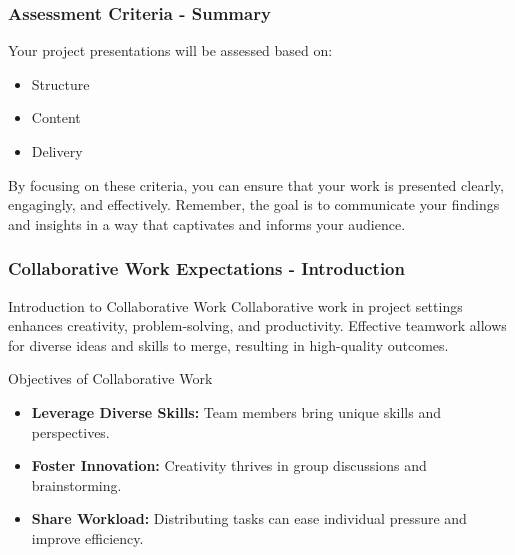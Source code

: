\documentclass[aspectratio=169]{beamer}
\begin{document}
\begin{frame}[fragile]
  \frametitle{Assessment Criteria - Summary}
  Your project presentations will be assessed based on:
  \begin{itemize}
    \item Structure
    \item Content
    \item Delivery
  \end{itemize}
  
  By focusing on these criteria, you can ensure that your work is presented clearly, engagingly, and effectively. 
  Remember, the goal is to communicate your findings and insights in a way that captivates and informs your audience.
\end{frame}

\begin{frame}[fragile]
    \frametitle{Collaborative Work Expectations - Introduction}
    \begin{block}{Introduction to Collaborative Work}
        Collaborative work in project settings enhances creativity, problem-solving, and productivity. Effective teamwork allows for diverse ideas and skills to merge, resulting in high-quality outcomes.
    \end{block}
    
    \begin{block}{Objectives of Collaborative Work}
        \begin{itemize}
            \item \textbf{Leverage Diverse Skills:} Team members bring unique skills and perspectives.
            \item \textbf{Foster Innovation:} Creativity thrives in group discussions and brainstorming.
            \item \textbf{Share Workload:} Distributing tasks can ease individual pressure and improve efficiency.
        \end{itemize}
    \end{block}
\end{frame}
\end{document}

